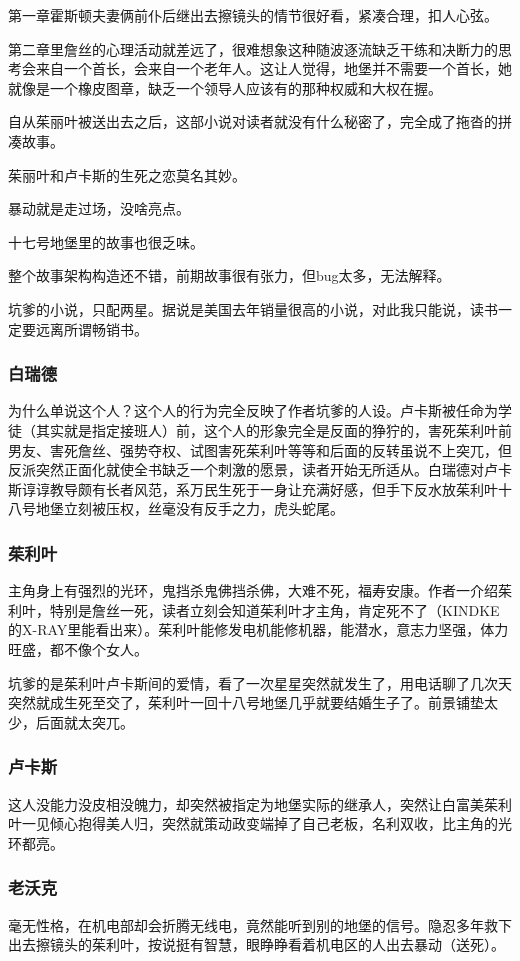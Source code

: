 第一章霍斯顿夫妻俩前仆后继出去擦镜头的情节很好看，紧凑合理，扣人心弦。

第二章里詹丝的心理活动就差远了，很难想象这种随波逐流缺乏干练和决断力的思考会来自一个首长，会来自一个老年人。这让人觉得，地堡并不需要一个首长，她就像是一个橡皮图章，缺乏一个领导人应该有的那种权威和大权在握。

自从茱丽叶被送出去之后，这部小说对读者就没有什么秘密了，完全成了拖沓的拼凑故事。

茱丽叶和卢卡斯的生死之恋莫名其妙。

暴动就是走过场，没啥亮点。

十七号地堡里的故事也很乏味。

整个故事架构构造还不错，前期故事很有张力，但bug太多，无法解释。

坑爹的小说，只配两星。据说是美国去年销量很高的小说，对此我只能说，读书一定要远离所谓畅销书。

\subsubsection{白瑞德}
为什么单说这个人？这个人的行为完全反映了作者坑爹的人设。卢卡斯被任命为学徒（其实就是指定接班人）前，这个人的形象完全是反面的狰狞的，害死茱利叶前男友、害死詹丝、强势夺权、试图害死茱利叶等等和后面的反转虽说不上突兀，但反派突然正面化就使全书缺乏一个刺激的愿景，读者开始无所适从。白瑞德对卢卡斯谆谆教导颇有长者风范，系万民生死于一身让充满好感，但手下反水放茱利叶十八号地堡立刻被压权，丝毫没有反手之力，虎头蛇尾。

\subsubsection{茱利叶}
主角身上有强烈的光环，鬼挡杀鬼佛挡杀佛，大难不死，福寿安康。作者一介绍茱利叶，特别是詹丝一死，读者立刻会知道茱利叶才主角，肯定死不了（KINDKE的X-RAY里能看出来）。茱利叶能修发电机能修机器，能潜水，意志力坚强，体力旺盛，都不像个女人。

坑爹的是茱利叶卢卡斯间的爱情，看了一次星星突然就发生了，用电话聊了几次天突然就成生死至交了，茱利叶一回十八号地堡几乎就要结婚生子了。前景铺垫太少，后面就太突兀。

\subsubsection{卢卡斯}
这人没能力没皮相没魄力，却突然被指定为地堡实际的继承人，突然让白富美茱利叶一见倾心抱得美人归，突然就策动政变端掉了自己老板，名利双收，比主角的光环都亮。

\subsubsection{老沃克}
毫无性格，在机电部却会折腾无线电，竟然能听到别的地堡的信号。隐忍多年救下出去擦镜头的茱利叶，按说挺有智慧，眼睁睁看着机电区的人出去暴动（送死）。
